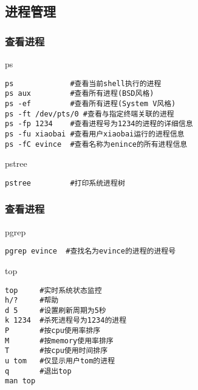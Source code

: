 \documentclass[xcolor=svgnames,presentation]{beamer}
\begin{document}
\subsection{进程管理}
\label{sec-3-1}
\begin{frame}[fragile]
\frametitle{查看进程}
\label{sec-3-1-1}
\begin{exampleblock}{ps}
\label{sec-3-1-1-1}


\begin{verbatim}
ps             #查看当前shell执行的进程
ps aux         #查看所有进程(BSD风格)
ps -ef         #查看所有进程(System V风格)
ps -ft /dev/pts/0 #查看与指定终端关联的进程
ps -fp 1234    #查看进程号为1234的进程的详细信息
ps -fu xiaobai #查看用户xiaobai运行的进程信息
ps -fC evince  #查看名称为enince的所有进程信息
\end{verbatim}
\end{exampleblock}
\begin{block}{pstree}
\label{sec-3-1-1-2}


\begin{verbatim}
pstree         #打印系统进程树
\end{verbatim}
\end{block}
\end{frame}
\begin{frame}[fragile]
\frametitle{查看进程}
\label{sec-3-1-2}
\begin{block}{pgrep}
\label{sec-3-1-2-1}


\begin{verbatim}
pgrep evince  #查找名为evince的进程的进程号
\end{verbatim}
\end{block}
\begin{exampleblock}{top}
\label{sec-3-1-2-2}


\begin{verbatim}
top     #实时系统状态监控
h/?     #帮助
d 5     #设置刷新周期为5秒
k 1234  #杀死进程号为1234的进程
P       #按cpu使用率排序
M       #按memory使用率排序
T       #按cpu使用时间排序
u tom   #仅显示用户tom的进程
q       #退出top
man top
\end{verbatim}
\end{exampleblock}
\end{frame}
\end{document}
